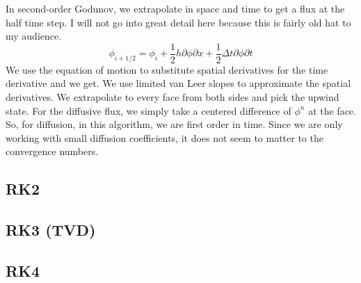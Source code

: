 \documentclass{article}
\newcommand{\dt}{{\Delta t}}
\newcommand{\dx}{{h}}
\newcommand{\half}{\frac{1}{2}}
\begin{document}
In second-order Godunov, we extrapolate in space and time to get a
flux at the half time step.   I will not go into great detail here
because this is fairly old hat to my audience.
$$
\phi_{i+1/2} = \phi_i + \half\dx \partial{\phi}{\partial x} + \half\dt \partial{\phi}{\partial t}
$$
We use the equation of motion to substitute spatial derivatives for
the time derivative and we get.   We use  limited van Leer slopes to
approximate the spatial derivatives.  We extrapolate to every face
from both sides and pick the upwind state.   For the diffusive flux,
we simply take a centered difference of $\phi^n$ at the face.  So, for
diffusion, in this algorithm, we are first order in time.   Since we
are only working with small diffusion coefficients, it does not seem
to matter to the convergence numbers.

\subsection{RK2}
\subsection{RK3 (TVD)}
\subsection{RK4}


\end{document}
